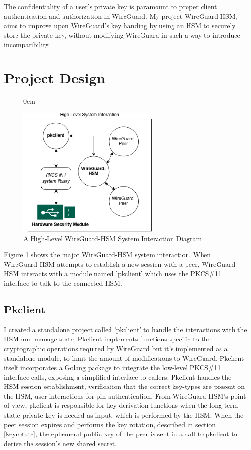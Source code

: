 \documentclass [11pt, proquest] {uwthesis}[2020/02/24]
\begin{document}
The confidentiality of a user's private key is paramount to proper client authentication and authorization in WireGuard. My project WireGuard-HSM, aims to improve upon WireGuard's key handing by using an HSM to securely store the private key, without modifying WireGuard in such a way to introduce incompatibility.

\section{Project Design}
\begin{figure}
\itemsep0em 
\begin{center}
\includegraphics[width=7cm]{paper/images/high-level-overview.png}
\caption{A High-Level WireGuard-HSM System Interaction Diagram}
\label{fig:highlevel_system}
\end{center}
\end{figure}
Figure \ref{fig:highlevel_system} shows the major WireGuard-HSM system interaction. When WireGuard-HSM attempts to establish a new session with a peer, WireGuard-HSM interacts with a module named 'pkclient' which uses the PKCS\#11 interface to talk to the connected HSM. 

\subsection{Pkclient}
\label{pk_design}
I created a standalone project called 'pkclient' to handle the interactions with the HSM and manage state. Pkclient implements functions specific to the cryptographic operations required by WireGuard but it's implemented as a standalone module, to limit the amount of modifications to WireGuard. Pkclient itself incorporates a Golang package to integrate the low-level PKCS\#11 interface calls, exposing a simplified interface to callers.  Pkclient handles the HSM session establishment, verification that the correct key-types are present on the HSM, user-interactions for pin authentication. 
From WireGuard-HSM's point of view, pkclient is responsible for key derivation functions when the long-term static private key is needed as input, which is performed by the HSM. When the peer session expires and performs the key rotation, described in section \ref{keyrotate}, the ephemeral public key of the peer is sent in a call to pkclient to derive the session's new shared secret. 
\end{document}
